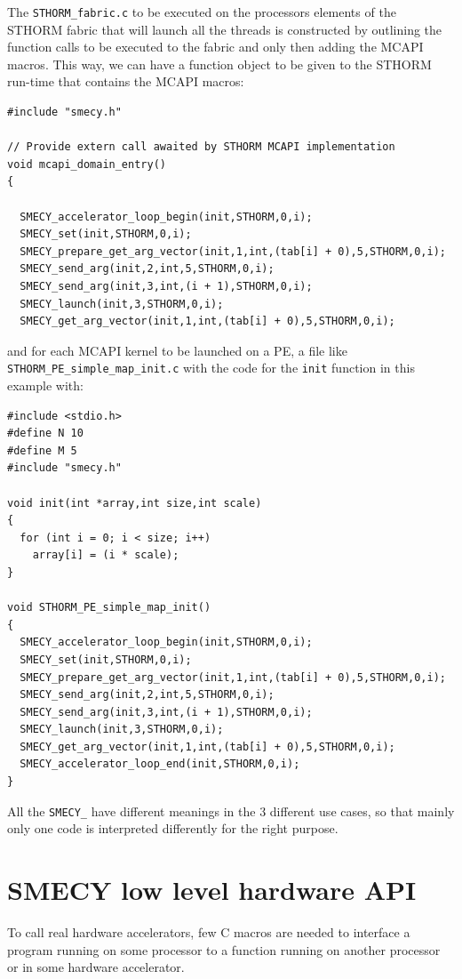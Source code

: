 \documentclass[a4paper]{article}
\begin{document}
The \verb|STHORM_fabric.c| to be executed on the processors elements
of the STHORM fabric that will launch all the threads is constructed by
outlining the function calls to be executed to the fabric and only then
adding the MCAPI macros. This way, we can have a function object to be
given to the STHORM run-time that contains the MCAPI macros:
\begin{lstlisting}
#include "smecy.h"

// Provide extern call awaited by STHORM MCAPI implementation
void mcapi_domain_entry()
{

  SMECY_accelerator_loop_begin(init,STHORM,0,i);
  SMECY_set(init,STHORM,0,i);
  SMECY_prepare_get_arg_vector(init,1,int,(tab[i] + 0),5,STHORM,0,i);
  SMECY_send_arg(init,2,int,5,STHORM,0,i);
  SMECY_send_arg(init,3,int,(i + 1),STHORM,0,i);
  SMECY_launch(init,3,STHORM,0,i);
  SMECY_get_arg_vector(init,1,int,(tab[i] + 0),5,STHORM,0,i);
\end{lstlisting}
and for each MCAPI kernel to be launched on a PE, a file like
\verb|STHORM_PE_simple_map_init.c| with the code for the \verb|init|
function in this example with:
\begin{lstlisting}
#include <stdio.h>
#define N 10
#define M 5
#include "smecy.h"

void init(int *array,int size,int scale)
{
  for (int i = 0; i < size; i++)
    array[i] = (i * scale);
}

void STHORM_PE_simple_map_init()
{
  SMECY_accelerator_loop_begin(init,STHORM,0,i);
  SMECY_set(init,STHORM,0,i);
  SMECY_prepare_get_arg_vector(init,1,int,(tab[i] + 0),5,STHORM,0,i);
  SMECY_send_arg(init,2,int,5,STHORM,0,i);
  SMECY_send_arg(init,3,int,(i + 1),STHORM,0,i);
  SMECY_launch(init,3,STHORM,0,i);
  SMECY_get_arg_vector(init,1,int,(tab[i] + 0),5,STHORM,0,i);
  SMECY_accelerator_loop_end(init,STHORM,0,i);
}
\end{lstlisting}
All the \verb|SMECY_| have different meanings in the 3 different use
cases, so that mainly only one code is interpreted differently for the
right purpose.


\section{SMECY low level hardware API}
\label{sec:low-level-hardware}

To call real hardware accelerators, few C macros are needed to interface a
program running on some processor to a function running on another
processor or in some hardware accelerator.
\end{document}

